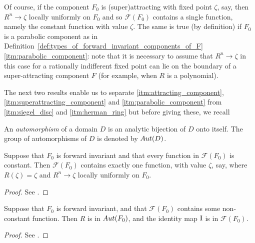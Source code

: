 Of course, if the component $F_0$ is (super)attracting with fixed point $\zeta$,
say, then $R^n \to \zeta$ locally uniformly on $F_0$ and so $\mathcal{F}(F_0)$
contains a single function, namely the constant function with value $\zeta$. The
same is true (by definition) if $F_0$ is a parabolic component as in
Definition~\ref{def:types_of_forward_invariant_components_of_F}\ref{itm:parabolic_component}:
note that it is necessary to assume that $R^n \to \zeta$ in this case for a
rationally indifferent fixed point can lie on the boundary of a super-attracting
component $F$ (for example, when $R$ is a polynomial).

The next two results enable us to separate \ref{itm:attracting_component},
\ref{itm:superattracting_component} and \ref{itm:parabolic_component} from
\ref{itm:siegel_disc} and \ref{itm:herman_ring} but before giving these, we
recall 

\begin{definition}[Automorphism]
    An \emph{automorphism} of a domain $D$ is an analytic bijection of $D$ onto
    itself. The group of automorphisms of $D$ is denoted by $\mathop{Aut}({D})$.
\end{definition}

\begin{theorem}[$F_0$ forward invariant and $\mathcal{F}(F_0)$ has only constant functions $\implies \mathcal{F}(F_0) = \{\zeta\}$ fixed point and $R^n \to \zeta$ locally uniformly on $F_0$]
    \label{thm:if_all_limit_functions_are_constant_on_F0_all_limit_functions_all_constant_equals_to_the_limit_fixed_point_of_F0}
    Suppose that $F_0$ is forward invariant and that every function in
    $\mathcal{F}(F_0)$ is constant. Then $\mathcal{F}(F_0)$ contains exactly one
    function, with value $\zeta$, say, where $R(\zeta) = \zeta$ and $R^n \to
    \zeta$ locally uniformly on $F_0$.
\end{theorem}
\begin{proof}
    See \cite[163]{Beardon1991}.
\end{proof}

\begin{theorem}
    \label{thm:if_there_is_a_nonconstant_limit_function_on_F0_all_limit_functions_are_automorphisms_and_id_is_a_limit_function}
    Suppose that $F_0$ is forward invariant, and that $\mathcal{F}(F_0)$ contains
    some non-constant function. Then $R$ is in $\mathop{Aut}({F_0})$, and the
    identity map $\mathrm{I}$ is in $\mathcal{F}(F_0)$.
\end{theorem}
\begin{proof}
    See \cite[163--164]{Beardon1991}.
\end{proof}

